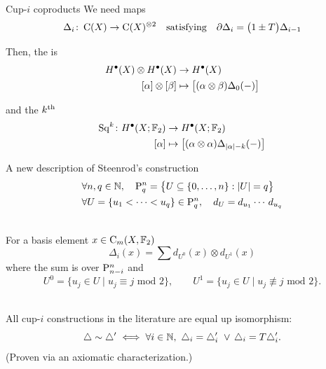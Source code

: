 
\begin{frame}{Cup-$i$ coproducts}
	\pause
	We need  maps
	\[
	\Delta_i \colon \gchains(X) \to \gchains(X)^{\otimes 2}
	\quad \text{satisfying} \quad
	\partial \Delta_{i} = \big(1 \pm T \big) \Delta_{i-1}
	\]

	\pause\bigskip\smallskip
	Then, the  is
	\[
	\begin{split}
		H^\bullet(X) \ot H^\bullet(X) &\to H^\bullet(X) \\
		[\alpha] \ot [\beta] &\mapsto \big[ (\alpha \otimes \beta) \Delta_0(-) \big]
	\end{split}
	\]

	\smallskip\pause
	and the $k^\th$ 
	\[
	\begin{split}
		\Sq^k \colon H^\bullet(X; \Ftwo) &\to H^\bullet(X; \Ftwo) \\
		[\alpha] &\mapsto \big[ (\alpha \otimes \alpha) \Delta_{\bars{\alpha}-k}(-) \big]
	\end{split}
	\]
\end{frame}

\begin{frame}{A new description of Steenrod's construction}
	\pause
	\vspace*{-10pt}
	\begin{align*}
		&\forall n,q \in \N,
		\quad \rP_q^n = \set[\big]{U \subseteq \{0, \dots, n\} : \bars{U} = q} \\
		&\forall U = \{u_1 < \dots < u_q\} \in \rP_q^n,
		\quad d_U = d_{u_1} \dotsm \, d_{u_q}
	\end{align*}

	\pause
	 \\
	For a basis element $x \in \gchains_m(X, \Ftwo)$
	\[
	\textstyle \Delta_i(x) = \sum d_{U^0}(x) \otimes d_{U^1}(x)
	\]
	where the sum is over $\rP^n_{n-i}$ and
	\begin{equation*} \label{e:partition subsets}
		U^0 = \{u_j \in U\mid u_j \equiv j \text{ mod } 2\}, \qquad
		U^1 = \{u_j \in U\mid u_j \not\equiv j \text{ mod } 2\}.
	\end{equation*}

	\pause\medskip
	 \\
	All cup-$i$ constructions in the literature are equal up isomorphism:
	\vskip -7.5pt
	\[
	\triangle \sim \triangle^\prime \iff \forall i \in \N, \ \triangle_i = \triangle_i^\prime \ \vee \, \triangle_i = T \triangle_i^\prime.
	\]
	\vskip -3pt
	(Proven via an axiomatic characterization.)
\end{frame}

